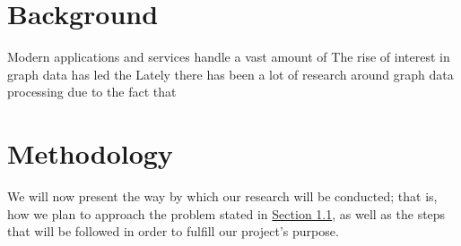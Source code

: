 \documentclass[a4paper,11pt]{article}
\begin{document}




\section{Background} \label{background}

\par Modern applications and services handle a vast amount of 
The rise of interest in graph data has led the Lately there has been a lot of research around graph data processing due to the fact that 


\section{Methodology} \label{methodology}

\par We will now present the way by which our research will be conducted; that is, how we plan to approach the problem stated in \hyperref[problem-statement]{Section 1.1}, as well as the steps that will be followed in order to fulfill our project's purpose.

\end{document}
